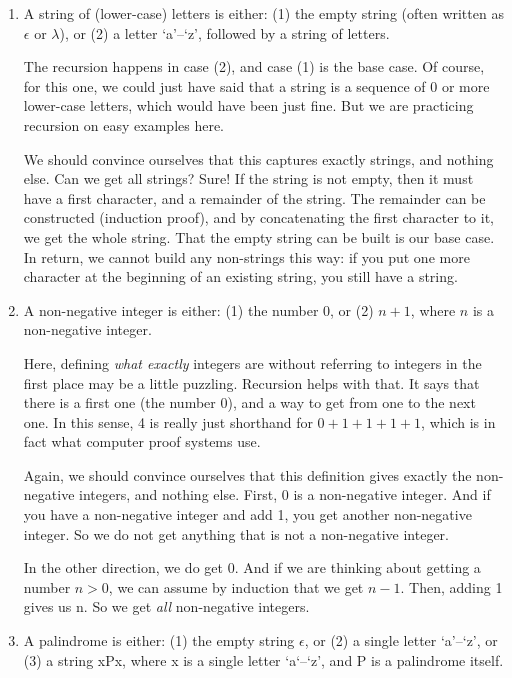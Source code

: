 \begin{enumerate}
\item A string of (lower-case) letters is either:
(1) the empty string (often written as $\epsilon$ or $\lambda$), or
(2) a letter `a'--`z', followed by a string of letters.

The recursion happens in case (2), and case (1) is the base case.
Of course, for this one, we could just have said that a string is a
sequence of 0 or more lower-case letters, which would have been just
fine.
But we are practicing recursion on easy examples here.

We should convince ourselves that this captures exactly strings,
and nothing else.
Can we get all strings? Sure!
If the string is not empty, then it must have a first character,
and a remainder of the string.
The remainder can be constructed (induction proof),
and by concatenating the first character to it, we get the whole string.
That the empty string can be built is our base case.
In return, we cannot build any non-strings this way: if you put one
more character at the beginning of an existing string, you still have
a string.

\item A non-negative integer is either:
(1) the number 0, or
(2) $n+1$, where $n$ is a non-negative integer.

Here, defining \emph{what exactly} integers are without referring to
integers in the first place may be a little puzzling.
Recursion helps with that.
It says that there is a first one (the number 0),
and a way to get from one to the next one.
In this sense, 4 is really just shorthand for $0+1+1+1+1$,
which is in fact what computer proof systems use.

Again, we should convince ourselves that this definition gives exactly
the non-negative integers, and nothing else.
First, 0 is a non-negative integer.
And if you have a non-negative integer and add 1,
you get another non-negative integer.
So we do not get anything that is not a non-negative integer.

In the other direction, we do get 0.
And if we are thinking about getting a number $n > 0$,
we can assume by induction that we get $n-1$.
Then, adding 1 gives us n.
So we get \emph{all} non-negative integers.

\item A palindrome is either:
(1) the empty string $\epsilon$, or
(2) a single letter `a'--`z', or
(3) a string xPx, where x is a single letter `a`--`z', and P is a
palindrome itself.


\end{enumerate}

